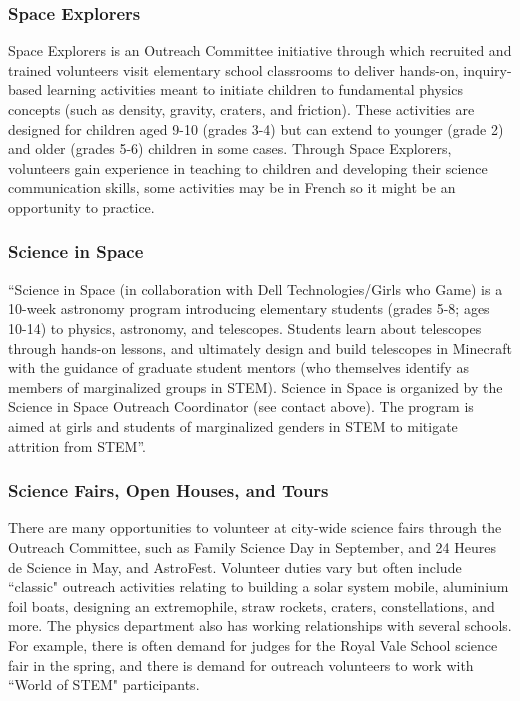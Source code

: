 \subsubsection{Space Explorers}
Space Explorers is an Outreach Committee initiative through which recruited and trained volunteers visit elementary school classrooms to deliver hands-on, inquiry-based learning activities meant to initiate children to fundamental physics concepts (such as density, gravity, craters, and friction). These activities are designed for children aged 9-10 (grades 3-4) but can extend to younger (grade 2) and older (grades 5-6) children in some cases. Through Space Explorers, volunteers gain experience in teaching to children and developing their science communication skills, some activities may be in French so it might be an opportunity to practice.

\subsubsection{Science in Space} 
“Science in Space (in collaboration with Dell Technologies/Girls who Game) is a 10-week astronomy program introducing elementary students (grades 5-8; ages 10-14) to physics, astronomy, and telescopes. Students learn about telescopes through hands-on lessons, and ultimately design and build telescopes in Minecraft with the guidance of graduate student mentors (who themselves identify as members of marginalized groups in STEM). Science in Space is organized by the Science in Space Outreach Coordinator (see contact above). The program is aimed at girls and students of marginalized genders in STEM to mitigate attrition from STEM”.

\subsubsection{Science Fairs, Open Houses, and Tours}
There are many opportunities to volunteer at city-wide science fairs through the Outreach Committee, such as Family Science Day in September, and 24 Heures de Science in May, and AstroFest. Volunteer duties vary but often include ``classic" outreach activities relating to building a solar system mobile, aluminium foil boats, designing an extremophile, straw rockets, craters, constellations, and more. The physics department also has working relationships with several schools. For example, there is often demand for judges for the Royal Vale School science fair in the spring, and there is demand for outreach volunteers to work with ``World of STEM" participants.

